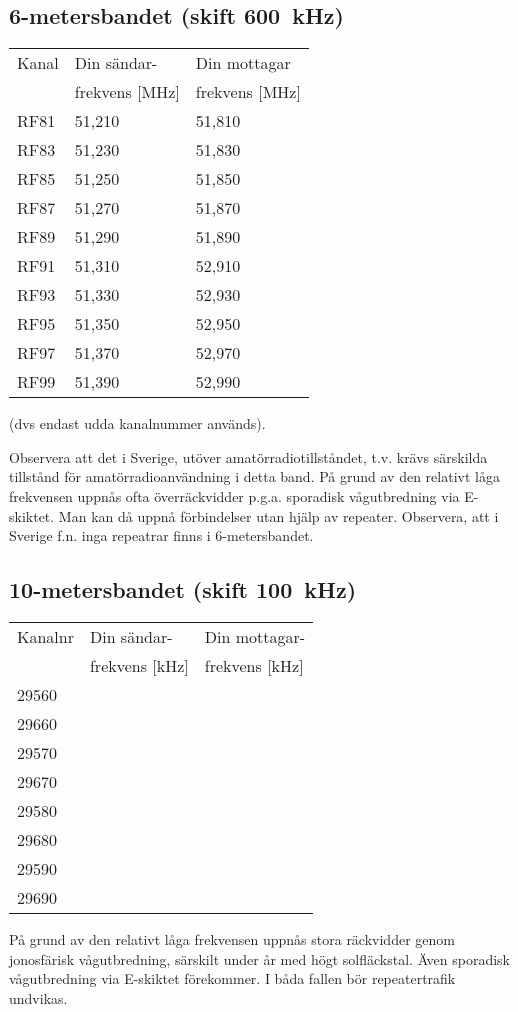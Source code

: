 \subsection{6-metersbandet (skift 600~kHz)}
\begin{tabular}{ l | l | l }
  Kanal & Din sändar- & Din mottagar \\
        & frekvens [MHz] & frekvens [MHz] \\
  \hline
  RF81 & 51,210 & 51,810 \\
  RF83 & 51,230 & 51,830 \\
  RF85 & 51,250 & 51,850 \\
  RF87 & 51,270 & 51,870 \\
  RF89 & 51,290 & 51,890 \\
  RF91 & 51,310 & 52,910 \\
  RF93 & 51,330 & 52,930 \\
  RF95 & 51,350 & 52,950 \\
  RF97 & 51,370 & 52,970 \\
  RF99 & 51,390 & 52,990 \\
\end{tabular}
(dvs endast udda kanalnummer används).

Observera att det i Sverige, utöver amatörradiotillståndet, t.v. krävs
särskilda tillstånd för amatörradioanvändning i detta band.
På grund av den relativt låga frekvensen uppnås ofta överräckvidder p.g.a.
sporadisk vågutbredning via E-skiktet.
Man kan då uppnå förbindelser utan hjälp av repeater.
Observera, att i Sverige f.n. inga repeatrar finns i 6-metersbandet.

\subsection{10-metersbandet (skift 100~kHz)}
\begin{tabular}{ l | l | l }
Kanalnr & Din sändar- & Din mottagar- \\
        & frekvens [kHz] & frekvens [kHz] \\
  \hline
29560 \\
29660 \\
29570 \\
29670 \\
29580 \\
29680 \\
29590 \\
29690 \\
\end{tabular}
På grund av den relativt låga frekvensen uppnås stora räckvidder genom
jonosfärisk vågutbredning, särskilt under år med högt solfläckstal.
Även sporadisk vågutbredning via E-skiktet förekommer.
I båda fallen bör repeatertrafik undvikas.
